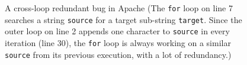 



\begin{figure}
  \centering
  \mbox{}
  \caption{A cross-loop redundant bug in Apache (The \texttt{for} loop on line 7 
searches a string \texttt{source} for a target sub-string 
\texttt{target}. Since the outer loop on line 2 appends one 
character to \texttt{source} in every iteration (line 30), 
the \texttt{for} loop is always working on a similar 
\texttt{source} from its previous execution, with a lot of redundancy.) 
}
  \label{fig:Apache34464}
\end{figure}

